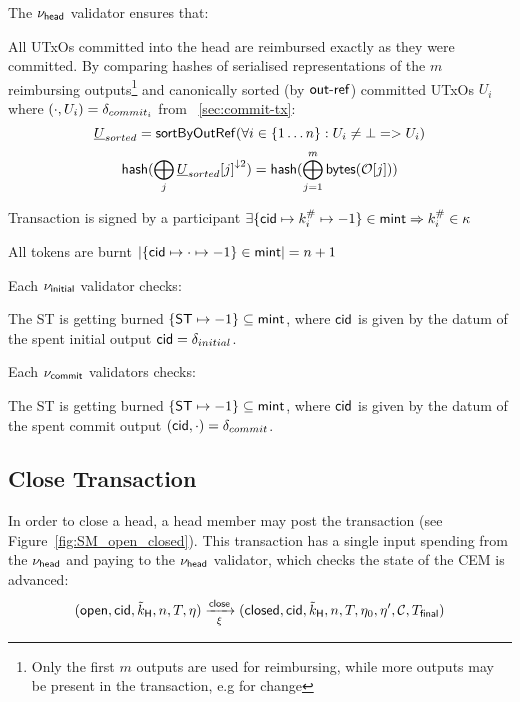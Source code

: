 \noindent The $\nu_\mathsf{head}$ validator ensures that:
\begin{menumerate}
  \item All UTxOs committed into the head are reimbursed exactly as they were
  committed. By comparing hashes of serialised representations of the $m$
  reimbursing outputs\footnote{Only the first $m$ outputs are used for
    reimbursing, while more outputs may be present in the transaction, e.g for
    change} and canonically sorted (by $\mathsf{out\textsf{-}{}ref}$) committed UTxOs $U_{i}$ where $(\cdot, U_{i}) = \delta_{commit_{i}}$ from \mtxCom{}~\ref{sec:commit-tx}:
  \[
    \underline{U}_{sorted} = \mathsf{sortByOutRef} ( \forall i \in \{1\dots n\} : U_{i} \neq \bot => U_{i})
  \]
  \[
    \mathsf{hash}(\bigoplus_{j}{\underline{U}_{sorted}[j]}^{\downarrow 2}) = \mathsf{hash}(\bigoplus_{j=1}^{m} \mathsf{bytes}(\mathcal{O}[j]))
  \]

  \item Transaction is signed by a participant $\exists \{\mathsf{cid} \mapsto k^{\#}_{i} \mapsto -1\} \in \mathsf{mint} \Rightarrow k^{\#}_{i} \in \kappa$
  \item All tokens are burnt
  $|\{\mathsf{cid} \mapsto \cdot \mapsto -1\} \in \mathsf{mint}| = n + 1$
\end{menumerate}

\noindent Each $\nu_\mathsf{initial}$ validator checks:
\begin{menumerate}
  \item The ST is getting burned $\{\mathsf{ST} \mapsto -1\} \subseteq \mathsf{mint}$, where
  $\mathsf{cid}$ is given by the datum of the spent initial output
  $\mathsf{cid} = \delta_{initial}$.
\end{menumerate}

\noindent Each $\nu_\mathsf{commit}$ validators checks:
\begin{menumerate}
  \item The ST is getting burned $\{\mathsf{ST} \mapsto -1\} \subseteq \mathsf{mint}$, where
  $\mathsf{cid}$ is given by the datum of the spent commit output
  $(\mathsf{cid},\cdot) = \delta_{commit}$.
\end{menumerate}

\subsection{Close Transaction}\label{sec:close-tx}



In order to close a head, a head member may post the \mtxClose{} transaction
(see Figure~\ref{fig:SM_open_closed}). This transaction has a single input
spending from the $\nu_\mathsf{head}$ and paying to the $\nu_\mathsf{head}$ validator, which checks
the state of the CEM is advanced:
\[
  (\mathsf{open},\mathsf{cid},\tilde{k}_{\mathsf{H}},n,T,\eta) \xrightarrow[\xi]{\mathsf{close}} (\mathsf{closed},\mathsf{cid},\tilde{k}_{\mathsf{H}},n,T,\eta_0,\eta',\mathcal{C},T_{\mathsf{final}})
\]

